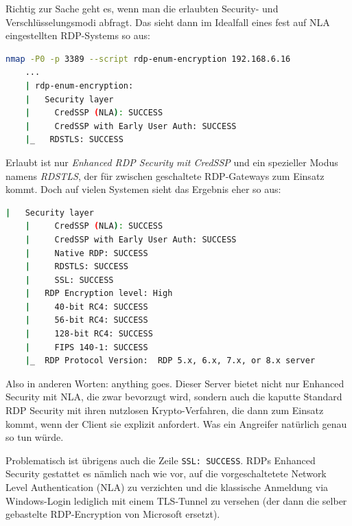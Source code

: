 Richtig zur Sache geht es, wenn man die erlaubten Security- und Verschlüsselungsmodi abfragt. Das sieht dann im Idealfall eines fest auf NLA eingestellten RDP-Systems so aus:

\begin{lstlisting}[language=bash]
    nmap -P0 -p 3389 --script rdp-enum-encryption 192.168.6.16
    ...
    | rdp-enum-encryption:
    |   Security layer
    |     CredSSP (NLA): SUCCESS
    |     CredSSP with Early User Auth: SUCCESS
    |_   RDSTLS: SUCCESS
\end{lstlisting}

Erlaubt ist nur \textit{Enhanced RDP Security mit CredSSP} und ein spezieller Modus namens \textit{RDSTLS}, der für zwischen geschaltete RDP-Gateways zum Einsatz kommt. Doch auf vielen Systemen sieht das Ergebnis eher so aus:

\begin{lstlisting}[language=bash]
    |   Security layer
    |     CredSSP (NLA): SUCCESS
    |     CredSSP with Early User Auth: SUCCESS
    |     Native RDP: SUCCESS
    |     RDSTLS: SUCCESS
    |     SSL: SUCCESS
    |   RDP Encryption level: High
    |     40-bit RC4: SUCCESS
    |     56-bit RC4: SUCCESS
    |     128-bit RC4: SUCCESS
    |     FIPS 140-1: SUCCESS
    |_  RDP Protocol Version:  RDP 5.x, 6.x, 7.x, or 8.x server
\end{lstlisting}

Also in anderen Worten: \glqq anything goes\grqq. Dieser Server bietet nicht nur Enhanced Security mit NLA, die zwar bevorzugt wird, sondern auch die kaputte Standard RDP Security mit ihren nutzlosen Krypto-Verfahren, die dann zum Einsatz kommt, wenn der Client sie explizit anfordert. Was ein Angreifer natürlich genau so tun würde.

Problematisch ist übrigens auch die Zeile \lstinline|SSL: SUCCESS|. RDPs Enhanced Security gestattet es nämlich nach wie vor, auf die vorgeschaltetete Network Level Authentication (NLA) zu verzichten und die klassische Anmeldung via Windows-Login lediglich mit einem TLS-Tunnel zu versehen (der dann die selber gebastelte RDP-Encryption von Microsoft ersetzt).


